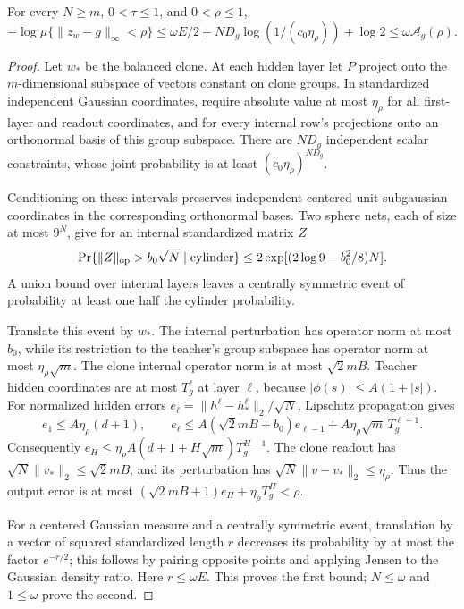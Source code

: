 \begin{lemma}
\label{lem:general-activation-cylinder}
For every $N\geq m$, $0<\tau\leq1$, and $0<\rho\leq1$,
\[
 -\log\mu\{\|z_w-g\|_\infty<\rho\}
 \leq\omega E/2+ND_g\log(1/(c_0\eta_\rho))+\log2
 \leq\omega\mathcal A_g(\rho).
\]
\end{lemma}
\begin{proof}
Let $w_*$ be the balanced clone.  At each hidden layer let $P$ project
onto the $m$-dimensional subspace of vectors constant on clone groups.
In standardized independent Gaussian coordinates, require absolute
value at most $\eta_\rho$ for all first-layer and readout coordinates,
and for every internal row's projections onto an orthonormal basis of
this group subspace.  There are $ND_g$ independent scalar constraints,
whose joint probability is at least $(c_0\eta_\rho)^{ND_g}$.

Conditioning on these intervals preserves independent centered
unit-subgaussian coordinates in the corresponding orthonormal bases.
Two sphere nets, each of size at most $9^N$, give for an internal
standardized matrix $Z$
\[
 \Pr\{\|Z\|_{\rm op}>b_0\sqrt N\mid\text{cylinder}\}
 \leq2\exp[(2\log9-b_0^2/8)N].
\]
A union bound over internal layers leaves a centrally symmetric event
of probability at least one half the cylinder probability.

Translate this event by $w_*$.  The internal perturbation has operator
norm at most $b_0$, while its restriction to the teacher's group
subspace has operator norm at most $\eta_\rho\sqrt m$.
The clone internal operator norm is at most $\sqrt2mB$.
Teacher hidden coordinates are at most $T_g^\ell$ at layer $\ell$,
because $|\phi(s)|\leq A(1+|s|)$.
For normalized hidden errors $e_\ell=\|h^\ell-h_*^\ell\|_2/\sqrt N$,
Lipschitz propagation gives
\[
 e_1\leq A\eta_\rho(d+1),\qquad
 e_\ell\leq A(\sqrt2mB+b_0)e_{\ell-1}
                +A\eta_\rho\sqrt m\,T_g^{\ell-1}.
\]
Consequently
$e_H\leq\eta_\rho A(d+1+H\sqrt m)T_g^{H-1}$.
The clone readout has $\sqrt N\|v_*\|_2\leq\sqrt2mB$, and its
perturbation has $\sqrt N\|v-v_*\|_2\leq\eta_\rho$.
Thus the output error is at most
$(\sqrt2mB+1)e_H+\eta_\rho T_g^H<\rho$.

For a centered Gaussian measure and a centrally symmetric event,
translation by a vector of squared standardized length $r$ decreases
its probability by at most the factor $e^{-r/2}$; this follows by
pairing opposite points and applying Jensen to the Gaussian density
ratio.  Here $r\leq\omega E$.  This proves the first bound; $N\leq\omega$
and $1\leq\omega$ prove the second.
\end{proof}


